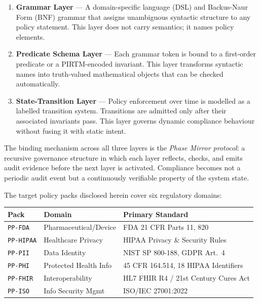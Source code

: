 \documentclass[12pt,letterpaper]{article}
\theoremstyle{definition}
\theoremstyle{plain}
\theoremstyle{remark}
\begin{document}
\begin{enumerate}[leftmargin=2em]
  \item \textbf{Grammar Layer} --- A domain-specific language (DSL) and
  Backus-Naur Form (BNF) grammar that assigns unambiguous syntactic structure to
  any policy statement. This layer does not carry semantics; it names policy
  elements.

  \item \textbf{Predicate Schema Layer} --- Each grammar token is bound to a
  first-order predicate or a PIRTM-encoded invariant. This layer transforms
  syntactic names into truth-valued mathematical objects that can be checked
  automatically.

  \item \textbf{State-Transition Layer} --- Policy enforcement over time is
  modelled as a labelled transition system. Transitions are admitted only after
  their associated invariants pass. This layer governs dynamic compliance
  behaviour without fusing it with static intent.
\end{enumerate}

The binding mechanism across all three layers is the \emph{Phase Mirror
protocol}: a recursive governance structure in which each layer reflects, checks,
and emits audit evidence before the next layer is activated. Compliance becomes
not a periodic audit event but a continuously verifiable property of the system
state.

The target policy packs disclosed herein cover six regulatory domains:

\begin{center}
\begin{tabular}{lll}
\toprule
\textbf{Pack} & \textbf{Domain} & \textbf{Primary Standard} \\
\midrule
\texttt{PP-FDA}   & Pharmaceutical/Device & FDA 21 CFR Parts 11, 820 \\
\texttt{PP-HIPAA} & Healthcare Privacy     & HIPAA Privacy \& Security Rules \\
\texttt{PP-PII}   & Data Identity          & NIST SP 800-188, GDPR Art.\ 4 \\
\texttt{PP-PHI}   & Protected Health Info  & 45 CFR 164.514, 18 HIPAA Identifiers \\
\texttt{PP-FHIR}  & Interoperability       & HL7 FHIR R4 / 21st Century Cures Act \\
\texttt{PP-ISO}   & Info Security Mgmt     & ISO/IEC 27001:2022 \\
\bottomrule
\end{tabular}
\end{center}
\end{document}
